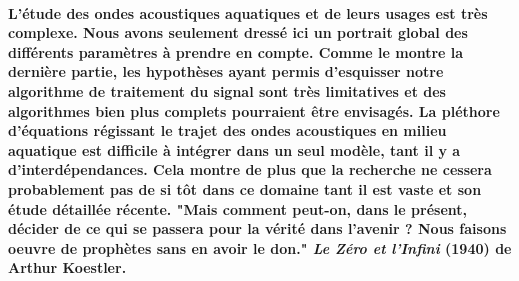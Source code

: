 \documentclass[a4paper,11pt]{article}
\begin{document}
\paragraph{\normalfont L'\'{e}tude des ondes acoustiques aquatiques et de leurs usages est tr\`{e}s complexe. Nous avons seulement dress\'{e} ici un portrait global des diff\'{e}rents param\`{e}tres \`{a} prendre en compte. Comme le montre la derni\`{e}re partie, les hypoth\`{e}ses ayant permis d'esquisser notre algorithme de traitement du signal sont tr\`{e}s limitatives et des algorithmes bien plus complets pourraient \^{e}tre envisag\'{e}s. La pl\'{e}thore d'\'{e}quations r\'{e}gissant le trajet des ondes acoustiques en milieu aquatique est difficile \`{a} int\'{e}grer dans un seul mod\`{e}le, tant il y a d'interd\'{e}pendances. Cela montre de plus que la recherche ne cessera probablement pas de si t\^{o}t dans ce domaine tant il est vaste et son \'{e}tude d\'{e}taill\'{e}e r\'{e}cente. \newline \newline
\textbf{"Mais comment peut-on, dans le pr\'{e}sent, d\'{e}cider de ce qui se passera pour la v\'{e}rit\'{e} dans l'avenir ? Nous faisons oeuvre de proph\`{e}tes sans en avoir le don."}\newline
\textit{Le Z\'{e}ro et l'Infini} (1940) de Arthur Koestler.}
\end{document}

